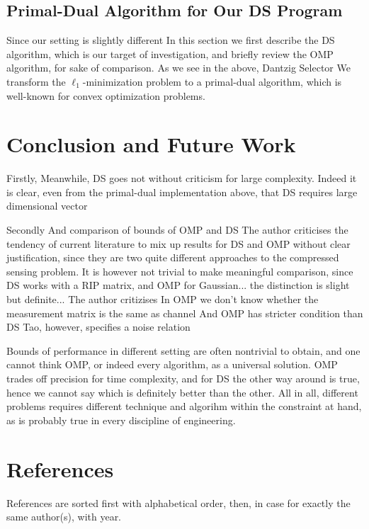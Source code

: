 \documentclass[12pt]{article}
\begin{document}
\subsection{Primal-Dual Algorithm for Our DS Program}


Since our setting is slightly different
In this section we first describe the DS algorithm, which is our target of investigation, and briefly review the OMP algorithm, for sake of comparison.
As we see in the above, Dantzig Selector 
We transform the \(\ell_1\)-minimization problem to a primal-dual algorithm, which is well-known for convex optimization problems.




\section{Conclusion and Future Work}

Firstly,
Meanwhile, DS goes not without criticism for large complexity.
Indeed it is clear, even from the primal-dual implementation above, that DS requires large dimensional vector

Secondly
And comparison of bounds of OMP and DS
The author criticises the tendency of current literature to mix up results for DS and OMP without clear justification, since they are two quite different approaches to the compressed sensing problem.
It is however not trivial to make meaningful comparison, since DS works with a RIP matrix, and OMP for Gaussian... the distinction is slight but definite...
The author critizises In OMP we don't know whether the measurement matrix is the same as channel
And OMP has stricter condition than DS
Tao, however, specifies a noise relation

Bounds of performance in different setting are often nontrivial to obtain, and one cannot think OMP, or indeed every algorithm, as a universal solution.
OMP trades off precision for time complexity, and for DS the other way around is true, hence we cannot say which is definitely better than the other.
All in all, different problems requires different technique and algorihm within the constraint at hand, as is probably true in every discipline of engineering.

\section{References}

References are sorted first with alphabetical order, then, in case for exactly the same author(s), with year.
\end{document}
